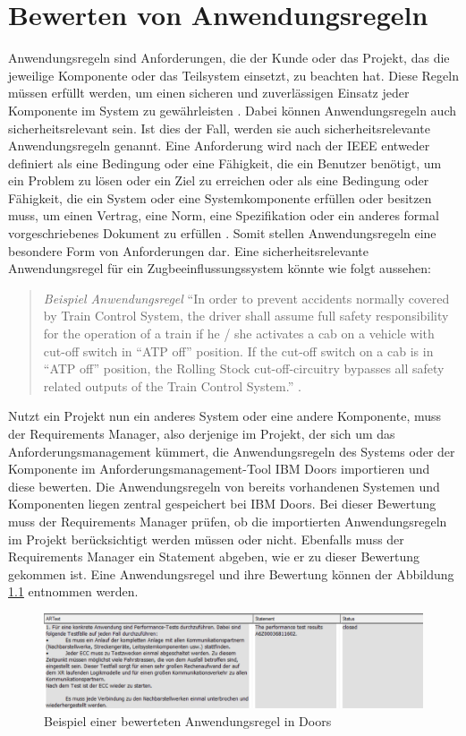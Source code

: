 \chapter{Bewerten von Anwendungsregeln}
\label{chap:kapitel2}

Anwendungsregeln sind Anforderungen, die der Kunde oder das Projekt, das die jeweilige Komponente oder das Teilsystem einsetzt, zu beachten hat. 
Diese Regeln müssen erfüllt werden, um einen sicheren und zuverlässigen Einsatz jeder Komponente im System zu gewährleisten \cite[S.9]{q2}. 
Dabei können Anwendungsregeln auch sicherheitsrelevant sein. Ist dies der Fall, werden sie auch sicherheitsrelevante Anwendungsregeln genannt. Eine Anforderung wird nach der 
IEEE entweder definiert als eine Bedingung oder eine Fähigkeit, die ein Benutzer benötigt, um ein Problem zu lösen oder ein Ziel zu erreichen oder als eine Bedingung oder Fähigkeit, 
die ein System oder eine Systemkomponente erfüllen oder besitzen muss, um einen Vertrag, eine Norm, eine Spezifikation oder ein anderes formal vorgeschriebenes Dokument 
zu erfüllen \cite[S.62]{q4}. Somit stellen Anwendungsregeln eine besondere Form von Anforderungen dar. Eine sicherheitsrelevante Anwendungsregel 
für ein Zugbeeinflussungssystem könnte wie folgt aussehen:

\begin{quotation}
	\textit{Beispiel Anwendungsregel} “In order to prevent accidents normally covered by Train Control System, the driver shall assume full safety responsibility for the operation of a train if he / she activates a cab on a vehicle 
    with cut-off switch in “ATP off” position. If the cut-off switch on a cab is in “ATP off” position, the Rolling Stock cut-off-circuitry bypasses all safety related outputs of the 
    Train Control System.” \cite[S.7]{q1}.
\end{quotation}

Nutzt ein Projekt nun ein anderes System oder eine andere Komponente, muss der Requirements Manager, also derjenige im Projekt, der sich um das Anforderungsmanagement kümmert, 
die Anwendungsregeln des Systems oder der Komponente im Anforderungsmanagement-Tool IBM Doors importieren und diese bewerten. Die Anwendungsregeln von bereits vorhandenen Systemen 
und Komponenten liegen zentral gespeichert bei IBM Doors. Bei dieser Bewertung muss der Requirements Manager prüfen, ob die importierten Anwendungsregeln im Projekt berücksichtigt 
werden müssen oder nicht. Ebenfalls muss der Requirements Manager ein Statement abgeben, wie er zu dieser Bewertung gekommen ist. Eine Anwendungsregel und ihre Bewertung können der 
Abbildung \ref*{fig:Bewertete Anwendungsregel} entnommen werden.

\begin{figure}[h]
    \centering
    \includegraphics[scale=0.65]{abbildungen/Bewertete Anwendungsregel.PNG}
    \caption{Beispiel einer bewerteten Anwendungsregel in Doors}
    \label{fig:Bewertete Anwendungsregel}
\end{figure}